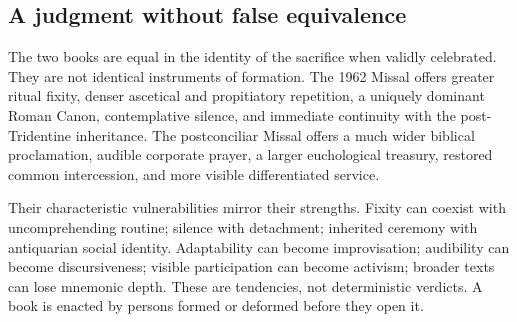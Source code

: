 \subsection{A judgment without false equivalence}

The two books are equal in the identity of the sacrifice when validly celebrated. They are not identical instruments of formation. The 1962 Missal offers greater ritual fixity, denser ascetical and propitiatory repetition, a uniquely dominant Roman Canon, contemplative silence, and immediate continuity with the post-Tridentine inheritance. The postconciliar Missal offers a much wider biblical proclamation, audible corporate prayer, a larger euchological treasury, restored common intercession, and more visible differentiated service.

Their characteristic vulnerabilities mirror their strengths. Fixity can coexist with uncomprehending routine; silence with detachment; inherited ceremony with antiquarian social identity. Adaptability can become improvisation; audibility can become discursiveness; visible participation can become activism; broader texts can lose mnemonic depth. These are tendencies, not deterministic verdicts. A book is enacted by persons formed or deformed before they open it.

